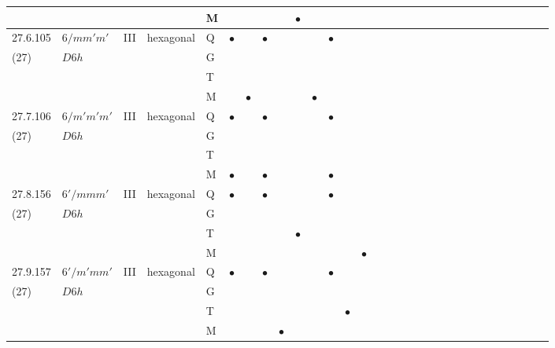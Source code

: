 \documentclass[fleqn,9pt,landscape]{jsarticle}
\begin{document}
\begin{longtable}{lllll|l|l|l|l|l|l|l|l|l|ll|ll|ll|ll|ll|ll|ll|ll}
 &  &  &  & M &  &  &  &  & $\bullet$ &  &  &  &  &  &  &  &  &  &  &  &  &  &  &  &  &  &  &  &  \\ \hline
27.6.105 & \texttt{$6/mm'm'$} & III & hexagonal & Q & $\bullet$ &  & $\bullet$ &  &  &  & $\bullet$ &  &  &  &  &  &  &  &  &  &  &  &  &  &  &  &  &  &  \\
(27) & $D6h$ &  &  & G &  &  &  &  &  &  &  &  &  &  &  &  &  &  &  &  &  &  &  &  &  &  &  &  &  \\
 &  &  &  & T &  &  &  &  &  &  &  &  &  &  &  &  &  &  &  &  &  &  &  &  &  &  &  &  &  \\
 &  &  &  & M &  & $\bullet$ &  &  &  & $\bullet$ &  &  &  &  &  &  &  &  &  &  &  &  &  &  &  &  &  &  &  \\ \hline
27.7.106 & \texttt{$6/m'm'm'$} & III & hexagonal & Q & $\bullet$ &  & $\bullet$ &  &  &  & $\bullet$ &  &  &  &  &  &  &  &  &  &  &  &  &  &  &  &  &  &  \\
(27) & $D6h$ &  &  & G &  &  &  &  &  &  &  &  &  &  &  &  &  &  &  &  &  &  &  &  &  &  &  &  &  \\
 &  &  &  & T &  &  &  &  &  &  &  &  &  &  &  &  &  &  &  &  &  &  &  &  &  &  &  &  &  \\
 &  &  &  & M & $\bullet$ &  & $\bullet$ &  &  &  & $\bullet$ &  &  &  &  &  &  &  &  &  &  &  &  &  &  &  &  &  &  \\ \hline
27.8.156 & \texttt{$6'/mmm'$} & III & hexagonal & Q & $\bullet$ &  & $\bullet$ &  &  &  & $\bullet$ &  &  &  &  &  &  &  &  &  &  &  &  &  &  &  &  &  &  \\
(27) & $D6h$ &  &  & G &  &  &  &  &  &  &  &  &  &  &  &  &  &  &  &  &  &  &  &  &  &  &  &  &  \\
 &  &  &  & T &  &  &  &  & $\bullet$ &  &  &  &  &  &  &  &  &  &  &  &  &  &  &  &  &  &  &  &  \\
 &  &  &  & M &  &  &  &  &  &  &  &  & $\bullet$ &  &  &  &  &  &  &  &  &  &  &  &  &  &  &  &  \\ \hline
27.9.157 & \texttt{$6'/m'mm'$} & III & hexagonal & Q & $\bullet$ &  & $\bullet$ &  &  &  & $\bullet$ &  &  &  &  &  &  &  &  &  &  &  &  &  &  &  &  &  &  \\
(27) & $D6h$ &  &  & G &  &  &  &  &  &  &  &  &  &  &  &  &  &  &  &  &  &  &  &  &  &  &  &  &  \\
 &  &  &  & T &  &  &  &  &  &  &  & $\bullet$ &  &  &  &  &  &  &  &  &  &  &  &  &  &  &  &  &  \\
 &  &  &  & M &  &  &  & $\bullet$ &  &  &  &  &  &  &  &  &  &  &  &  &  &  &  &  &  &  &  &  &  \\ \hline

\end{longtable}
\end{document}

